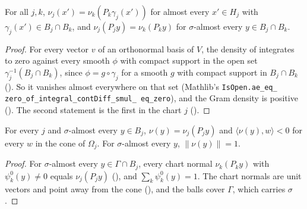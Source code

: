 \begin{theorem}
\label{thm:chart-normals-agree}
\leanok
{}
For all $j, k$, $\nu_j(x') = \nu_k(P_k \gamma_j(x'))$ for almost every $x' \in H_j$ with
$\gamma_j(x') \in B_j \cap B_k$, and $\nu_j(P_j y) = \nu_k(P_k y)$ for $\sigma$-almost every
$y \in B_j \cap B_k$.
\end{theorem}

\begin{proof}
\leanok
For every vector $v$ of an orthonormal basis of $V$, the density of
 integrates to zero against every smooth $\phi$ with compact
support in the open set $\gamma_j^{-1}(B_j \cap B_k)$, since $\phi = g \circ \gamma_j$ for a smooth
$g$ with compact support in $B_j \cap B_k$ (). So it vanishes
almost everywhere on that set (Mathlib's \texttt{IsOpen.\allowbreak ae\_\allowbreak eq\_\allowbreak
zero\_\allowbreak of\_\allowbreak integral\_\allowbreak contDiff\_\allowbreak smul\_\allowbreak
eq\_\allowbreak zero}), and the Gram density is positive (). The second
statement is the first in the chart $j$ ().
\end{proof}

\begin{theorem}
\label{thm:boundary-normal-chart}
\leanok
{}
For every $j$ and $\sigma$-almost every $y \in B_j$, $\nu(y) = \nu_j(P_j y)$ and
$\langle \nu(y), w \rangle < 0$ for every $w$ in the cone of $\Omega_j$. For $\sigma$-almost every
$y$, $\|\nu(y)\| = 1$.
\end{theorem}

\begin{proof}
\leanok
For $\sigma$-almost every $y \in \Gamma \cap B_j$, every chart normal $\nu_k(P_k y)$ with
$\psi^0_k(y) \neq 0$ equals $\nu_j(P_j y)$ (), and
$\sum_k \psi^0_k(y) = 1$. The chart normals are unit vectors and point away from the cone
(), and the balls cover $\Gamma$, which carries $\sigma$.
\end{proof}

